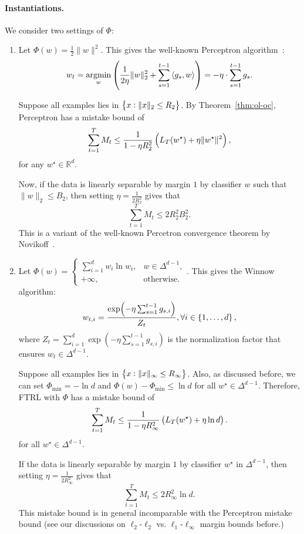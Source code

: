 \documentclass{article}
\DeclareMathOperator*{\argmin}{{\rm argmin}}
\newcommand{\RR}{\mathbb{R}} %
\newcommand{\inner}[2]{\left\langle #1,#2 \right\rangle}
\begin{document}
\paragraph{Instantiations.} We consider two settings of $\Phi$:
\begin{enumerate}
\item Let $\Phi(w) = \frac{1}{2}\|w\|^2$. This gives the well-known Perceptron algorithm~\cite{rosenblatt1958perceptron}:
\[ w_t = \argmin_{w} \del{ \frac{1}{2\eta}\| w \|_2^2 + \sum_{s=1}^{t-1} \inner{g_s}{w}} = -\eta \cdot \sum_{s=1}^{t-1} g_s. \]

Suppose all examples lies in $\cbr{x: \|x\|_2 \leq R_2}$.
By Theorem~\ref{thm:ol-oc}, Perceptron has a mistake bound of
\[ \sum_{t=1}^T M_t \leq \frac{1}{1-\eta R_2^2}\del{L_T(w^\star) + \eta\| w^\star \|^2}, \]
for any $w^\star \in \RR^d$.

Now, if the data is linearly separable by margin $1$ by classifier $w$ such that $\| w \|_2 \leq B_2$, then setting $\eta = \frac{1}{2R_2^2}$ gives that
\[ \sum_{t=1}^T M_t \leq 2 R_2^2 B_2^2. \]
This is a variant of the well-known Percetron convergence theorem by Novikoff~\cite{rosenblatt1958perceptron}.

\item Let $\Phi(w) = \begin{cases} \sum_{i=1}^d w_i \ln w_i, & w \in \Delta^{d-1}, \\ +\infty, & \text{otherwise}. \end{cases}$. This gives the  Winnow~\cite{littlestone1988learning} algorithm:
\[ w_{t,i} = \frac{\exp(-\eta \sum_{s=1}^{t-1} g_{s,i})}{Z_t}, \forall i \in \cbr{1,\ldots,d}, \]
where $Z_t = \sum_{i=1}^d \exp(-\eta \sum_{s=1}^{t-1} g_{s,i})$ is the normalization factor that ensures $w_t \in \Delta^{d-1}$.


Suppose all examples lies in $\cbr{x: \|x\|_\infty \leq R_\infty}$. Also, as discussed before, we can set $\Phi_{\min} = -\ln d$ and $\Phi(w) - \Phi_{\min} \leq \ln d$ for all $w^\star \in \Delta^{d-1}$. Therefore,
FTRL with $\Phi$ has a mistake bound of
\[ \sum_{t=1}^T M_t \leq \frac{1}{1-\eta R_\infty^2}\del{L_T(w^\star) + \eta \ln d}. \]
for all $w^\star \in \Delta^{d-1}$.

If the data is linearly separable by margin $1$ by classifier $w^\star$ in $\Delta^{d-1}$, then setting $\eta = \frac{1}{2R_\infty^2}$ gives that
\[ \sum_{t=1}^T M_t \leq 2 R_\infty^2 \ln d. \]
This mistake bound is in general incomparable with the Perceptron mistake bound (see our discussions on $\ell_2$-$\ell_2$ vs. $\ell_1$-$\ell_\infty$ margin bounds before.)
\end{enumerate}
\end{document}

